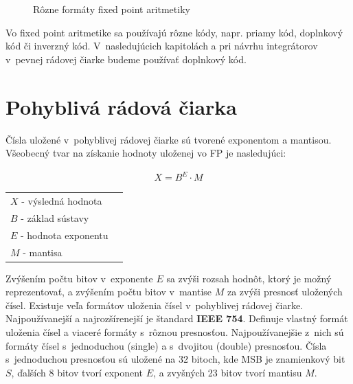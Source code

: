 \bigskip
\begin{figure}[h]
\centering
{}
\caption{Rôzne formáty fixed point aritmetiky \cite{KrausDisP}}
\label{formatfixpoint}
\end{figure}
\bigskip

Vo fixed point aritmetike sa používajú rôzne kódy, napr. priamy kód, doplnkový kód či inverzný kód. V~nasledujúcich kapitolách a pri návrhu integrátorov v~pevnej rádovej čiarke budeme používať doplnkový kód. 

\newpage
\section{Pohyblivá rádová čiarka}
Čísla uložené v~pohyblivej rádovej čiarke sú tvorené exponentom a mantisou. Všeobecný tvar na získanie hodnoty uloženej vo FP je nasledujúci:

\begin{eqnarray}
X = B^{E}\cdot M
\end{eqnarray}

\begin{tabular}{ll}
$ X $ - výsledná hodnota \\
$ B $ - základ sústavy \\
$ E $ - hodnota exponentu \\
$ M $ - mantisa \\
\end{tabular}
\bigskip

Zvýšením počtu bitov v~exponente $ E $ sa zvýši rozsah hodnôt, ktorý je možný reprezentovať, a zvýšením počtu bitov v~mantise $ M $ za zvýši presnosť uložených čísel. Existuje veľa formátov uloženia čísel v~pohyblivej rádovej čiarke. Najpoužívanejší a najrozšírenejší je štandard \textbf{IEEE 754}. Definuje vlastný formát uloženia čísel a viaceré formáty s~rôznou presnosťou. Najpoužívanejšie z~nich sú formáty čísel s~jednoduchou (single) a s~dvojitou (double) presnosťou. Čísla s~jednoduchou presnosťou sú uložené na 32 bitoch, kde MSB je znamienkový bit $ S $, ďalších 8 bitov tvorí exponent $ E $, a zvyšných 23 bitov tvorí mantisu $ M $.

